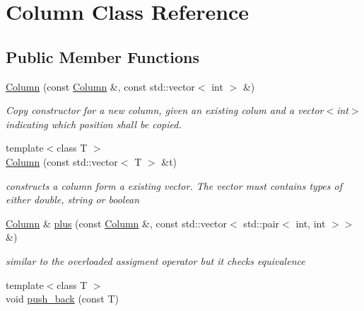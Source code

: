 \hypertarget{classColumn}{}\section{Column Class Reference}
\label{classColumn}
\subsection*{Public Member Functions}
\begin{DoxyCompactItemize}
\item 
\mbox{\label{classColumn_a10196a56bf17147b81a40aac7eda70f8}} 
\hyperlink{classColumn_a10196a56bf17147b81a40aac7eda70f8}{Column} (const \hyperlink{classColumn}{Column} \&, const std\+::vector$<$ int $>$ \&)
\begin{DoxyCompactList}\small\item\em Copy constructor for a new column, given an existing colum and a vector$<$int$>$ indicating which position shall be copied. \end{DoxyCompactList}\item 
\mbox{\label{classColumn_ab9bd37fa800223b400c0a1158ca244e1}} 
{\footnotesize template$<$class T $>$ }\\\hyperlink{classColumn_ab9bd37fa800223b400c0a1158ca244e1}{Column} (const std\+::vector$<$ T $>$ \&t)
\begin{DoxyCompactList}\small\item\em constructs a column form a existing vector. The vector must contains types of either double, string or boolean \end{DoxyCompactList}\item 
\mbox{\label{classColumn_af4232d458c38e5a2c5a75c660664e105}} 
\hyperlink{classColumn}{Column} \& \hyperlink{classColumn_af4232d458c38e5a2c5a75c660664e105}{plus} (const \hyperlink{classColumn}{Column} \&, const std\+::vector$<$ std\+::pair$<$ int, int $>$$>$ \&)
\begin{DoxyCompactList}\small\item\em similar to the overloaded assigment operator but it checks equivalence \end{DoxyCompactList}\item 
{\footnotesize template$<$class T $>$ }\\void \hyperlink{classColumn_a9f7b60a5645dd0b604922ad10f0a4528}{push\+\_\+back} (const T)
$$
\end{DoxyCompactItemize}
